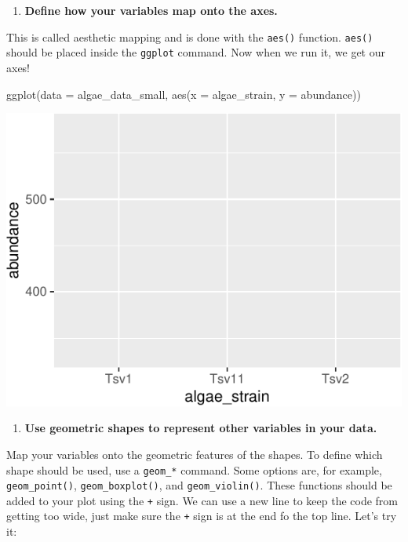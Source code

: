 \documentclass[
]{krantz}
\newenvironment{Shaded}{\begin{snugshade}}{\end{snugshade}}
\newcommand{\AttributeTok}[1]{\textcolor[rgb]{0.77,0.63,0.00}{#1}}
\newcommand{\FunctionTok}[1]{\textcolor[rgb]{0.00,0.00,0.00}{#1}}
\newcommand{\NormalTok}[1]{#1}
\providecommand{\tightlist}{%
  \setlength{\itemsep}{0pt}\setlength{\parskip}{0pt}}
\begin{document}
\begin{enumerate}
\def\labelenumi{\arabic{enumi}.}
\setcounter{enumi}{1}
\tightlist
\item
  \textbf{Define how your variables map onto the axes.}
\end{enumerate}

This is called aesthetic mapping and is done with the \texttt{aes()} function. \texttt{aes()} should be placed inside the \texttt{ggplot} command. Now when we run it, we get our axes!

\begin{Shaded}
\begin{Highlighting}[]
\FunctionTok{ggplot}\NormalTok{(}\AttributeTok{data =}\NormalTok{ algae\_data\_small, }\FunctionTok{aes}\NormalTok{(}\AttributeTok{x =}\NormalTok{ algae\_strain, }\AttributeTok{y =}\NormalTok{ abundance))}
\end{Highlighting}
\end{Shaded}

\begin{center}\includegraphics{index_files/figure-latex/unnamed-chunk-22-1} \end{center}

\begin{enumerate}
\def\labelenumi{\arabic{enumi}.}
\setcounter{enumi}{2}
\tightlist
\item
  \textbf{Use geometric shapes to represent other variables in your data.}
\end{enumerate}

Map your variables onto the geometric features of the shapes. To define which shape should be used, use a \texttt{geom\_*} command. Some options are, for example, \texttt{geom\_point()}, \texttt{geom\_boxplot()}, and \texttt{geom\_violin()}. These functions should be added to your plot using the \texttt{+} sign. We can use a new line to keep the code from getting too wide, just make sure the \texttt{+} sign is at the end fo the top line. Let's try it:
\end{document}
